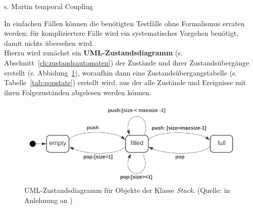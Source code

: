 \begin{tcolorbox}[colback=red!20]
    s. Martin temporal Coupling
\end{tcolorbox}

\noindent
In einfachen Fällen können die benötigten Testfälle ohne Formalismus erraten werden; für kompliziertere Fälle wird ein systematisches Vorgehen benötigt, damit nichts übersehen wird.\\
Hierzu wird zunächst ein \textbf{UML-Zustandsdiagramm} (s. Abschnitt~\ref{ch:zustandsautomaten}) der Zustände und ihrer Zustandsübergänge erstellt (s. Abbidung~\ref{fig:popstate}), woraufhin dann eine Zustandsübergangstabelle (s. Tabelle~\ref{tab:popstate}) erstellt wird, aus der alle Zustände und Ereignisse mit ihren Folgezuständen abgelesen werden können.

\begin{figure}
    \centering
    \includegraphics[scale=0.5]{part four/Testende Verfahren/img/popstate}
    \caption{UML-Zustandsdiagramm für Objekte der Klasse \textit{Stack}. (Quelle: in Anlehnung an \cite[Abb. 5.1, 47]{Wed09c})}
    \label{fig:popstate}
\end{figure}

